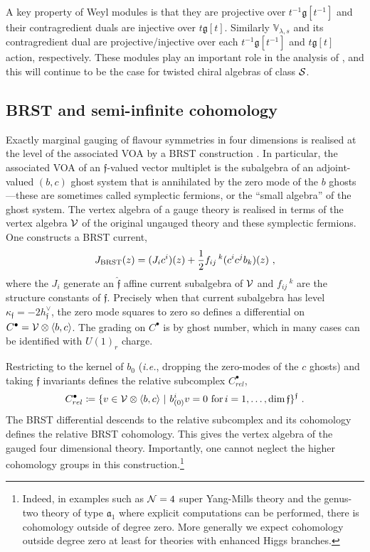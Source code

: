 \documentclass[a4paper]{article}
\def\IV{\mathbb{V}}
\def\NN{{\cal N}}
\def\SS{{\cal S}}
\def\VV{{\cal V}}
\def\dim{{\rm dim}}
\def\af{\mathfrak{a}}
\def\gf{\mathfrak{g}}
\def \ff{\mathfrak{f}}
\def \ie{{\it i.e.}}
\begin{document}
A key property of Weyl modules is that they are projective over $t^{-1}\gf[t^{-1}]$ and their contragredient duals are injective over $t\gf[t]$. Similarly $\IV_{\lambda,s}$ and its contragredient dual are projective/injective over each $t^{-1}\gf[t^{-1}]$ and $t\gf[t]$ action, respectively. These modules play an important role in the analysis of \cite{Arakawa:2018egx}, and this will continue to be the case for twisted chiral algebras of class $\SS$.

\subsection{BRST and semi-infinite cohomology}
\label{subsec:BRST_semiinfinite}

Exactly marginal gauging of flavour symmetries in four dimensions is realised at the level of the associated VOA by a BRST construction \cite{Beem:2013sza}. In particular, the associated VOA of an $\ff$-valued vector multiplet is the subalgebra of an adjoint-valued $(b,c)$ ghost system that is annihilated by the zero mode of the $b$ ghosts---these are sometimes called symplectic fermions, or the ``small algebra'' of the ghost system. The vertex algebra of a gauge theory is realised in terms of the vertex algebra $\VV$ of the original ungauged theory and these symplectic fermions. One constructs a BRST current,
\begin{equation}
	J_{\rm BRST}(z) = (J_ic^i)(z) + \frac{1}{2}f_{ij}\,^k(c^ic^jb_k)(z)~,
\end{equation}
where the $J_i$ generate an $\hat{\ff}$ affine current subalgebra of $\VV$ and $f_{ij}\,^{k}$ are the structure constants of $\ff$. Precisely when that current subalgebra has level $\kappa_{\ff}=-2h^\vee_\ff$, the zero mode squares to zero so defines a differential on $C^\bullet=\VV\otimes \langle b,c \rangle$. The grading on $C^\bullet$ is by ghost number, which in many cases can be identified with $U(1)_r$ charge.

Restricting to the kernel of $b_{0}$ (\ie, dropping the zero-modes of the $c$ ghosts) and taking $\ff$ invariants defines the relative subcomplex $C_{rel}^\bullet$,
\begin{equation}
	C_{rel}^\bullet \coloneqq \{v\in \VV\otimes \langle b,c \rangle~|~ b^i_{(0)}v=0 \text{ for}\, i=1,\dots,\dim\, \ff\}^{\ff}~.
\end{equation}
The BRST differential descends to the relative subcomplex and its cohomology defines the relative BRST cohomology. This gives the vertex algebra of the gauged four dimensional theory. Importantly, one cannot neglect the higher cohomology groups in this construction.\footnote{Indeed, in examples such as $\NN=4$ super Yang-Mills theory and the genus-two theory of type $\af_1$ where explicit computations can be performed, there is cohomology outside of degree zero. More generally we expect cohomology outside degree zero at least for theories with enhanced Higgs branches.}
\end{document}
